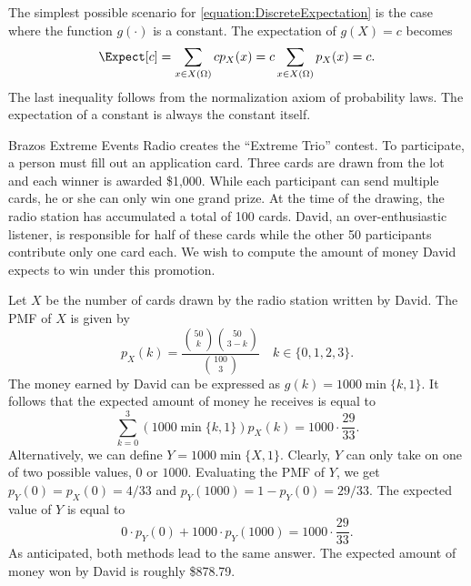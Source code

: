\begin{example}
The simplest possible scenario for \eqref{equation:DiscreteExpectation} is the case where the function $g(\cdot)$ is a constant.
The expectation of $g(X) = c$ becomes
\begin{equation*}
\Expect [ c ]
= \sum_{x \in X(\Omega)} c p_X (x)
= c \sum_{x \in X(\Omega)} p_X (x)
= c .
\end{equation*}
The last inequality follows from the normalization axiom of probability laws.
The expectation of a constant is always the constant itself.
\end{example}

\begin{example}
Brazos Extreme Events Radio creates the ``Extreme Trio'' contest.
To participate, a person must fill out an application card.
Three cards are drawn from the lot and each winner is awarded \$1,000.
While each participant can send multiple cards, he or she can only win one grand prize.
At the time of the drawing, the radio station has accumulated a total of 100 cards.
David, an over-enthusiastic listener, is responsible for half of these cards while the other 50 participants contribute only one card each.
We wish to compute the amount of money David expects to win under this promotion.

Let $X$ be the number of cards drawn by the radio station written by David.
The PMF of $X$ is given by
\begin{equation*}
p_X(k) = \frac{\binom{50}{k} \binom{50}{3-k}}{\binom{100}{3}}
\quad k \in \{ 0, 1, 2, 3 \}.
\end{equation*}
The money earned by David can be expressed as $g(k) = 1000 \min \{ k,1 \}$.
It follows that the expected amount of money he receives is equal to
\begin{equation*}
\sum_{k=0}^3 \left( 1000 \min \{ k, 1 \} \right) p_X(k)
= 1000 \cdot \frac{29}{33} .
\end{equation*}
Alternatively, we can define $Y = 1000 \min \{ X, 1 \}$.
Clearly, $Y$ can only take on one of two possible values, $0$ or $1000$.
Evaluating the PMF of $Y$, we get $p_Y(0) = p_X(0) = 4/33$ and $p_Y(1000) = 1 - p_Y(0) = 29/33$.
The expected value of $Y$ is equal to
\begin{equation*}
0 \cdot p_Y(0) + 1000 \cdot p_Y(1000) = 1000 \cdot \frac{29}{33} .
\end{equation*}
As anticipated, both methods lead to the same answer.
The expected amount of money won by David is roughly \$878.79.
\end{example}


